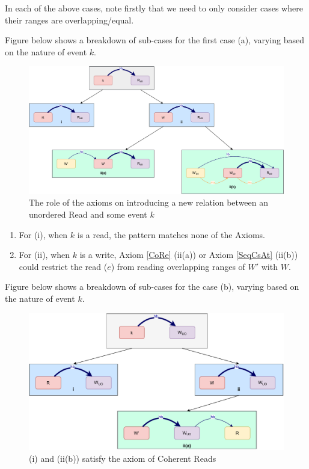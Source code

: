     In each of the above cases, note firstly that we need to only consider cases where their ranges are overlapping/equal.
    
    Figure below shows a breakdown of sub-cases for the first case (a), varying based
    on the nature of event $k$.
    \begin{figure}[H]
        \centering
        \includegraphics[scale=0.6]{InstructionReordering/ValidReorderingProof/ProofParts/Part4/part4(a).pdf}
        \caption{The role of the axioms on introducing a new relation between an unordered Read and some event $k$}
        \label{fig:my_label}
    \end{figure}
    
    \begin{enumerate}
        \item For (i), when $k$ is a read, the pattern matches none of the Axioms.
        \item For (ii), when $k$ is a write, Axiom \ref{CoRe} (ii(a)) or Axiom \ref{SeqCsAt} (ii(b)) could restrict the read ($e$) from reading overlapping ranges of $W'$ with $W$.
    \end{enumerate}
  
    Figure below shows a breakdown of sub-cases for the case (b), varying based
    on the nature of event $k$.
    \begin{figure}[H]
        \centering
        \includegraphics[scale=0.6]{InstructionReordering/ValidReorderingProof/ProofParts/Part4/part4(b).pdf}
        \caption{(i) and (ii(b)) satisfy the axiom of Coherent Reads}
        \label{fig:my_label}
    \end{figure}
          
